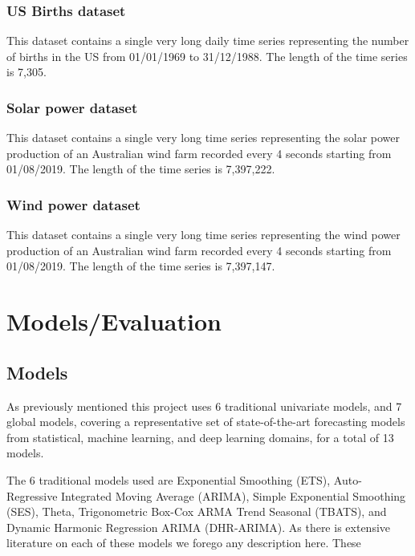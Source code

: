 \documentclass{article}
\begin{document}
\subsubsection{US Births dataset}
This dataset contains a single very long daily time series representing the number of births in the US
from 01/01/1969 to 31/12/1988. The length of the time series is 7,305.

\subsubsection{Solar power dataset}
This dataset contains a single very long time series representing the solar power production of an
Australian wind farm recorded every 4 seconds starting from 01/08/2019. The length of the time
series is 7,397,222.

\subsubsection{Wind power dataset}
This dataset contains a single very long time series representing the wind power production of an
Australian wind farm recorded every 4 seconds starting from 01/08/2019. The length of the time
series is 7,397,147.

\section{Models/Evaluation}

\subsection{Models}
As previously mentioned this project uses 6 traditional univariate models, and 7 global models, covering a representative set of state-of-the-art forecasting models from statistical, machine learning, and deep learning domains, for a total of 13 models.

The 6 traditional models used are Exponential Smoothing (ETS), Auto-Regressive Integrated Moving Average (ARIMA), Simple Exponential Smoothing
(SES), Theta, Trigonometric Box-Cox ARMA Trend Seasonal (TBATS), and Dynamic Harmonic Regression ARIMA (DHR-ARIMA). As there is extensive literature on each of these models we forego any description here. These 
\end{document}
